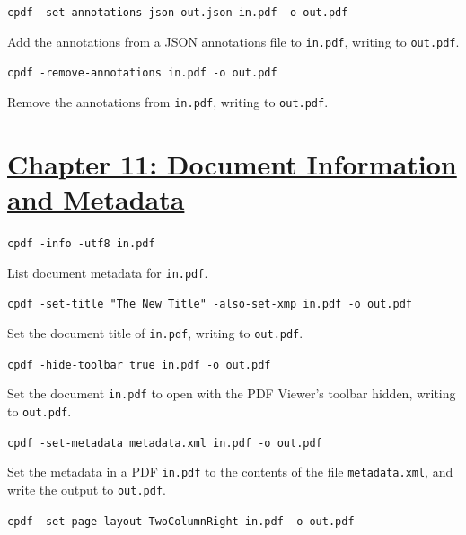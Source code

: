 \documentclass{book}
\begin{document}
\begin{framed}\noindent\texttt{cpdf -set-annotations-json out.json in.pdf -o out.pdf}\end{framed}

\noindent Add the annotations from a JSON annotations file to \texttt{in.pdf}, writing to \texttt{out.pdf}.

\begin{framed}\noindent\texttt{cpdf -remove-annotations in.pdf -o out.pdf}\end{framed}

\noindent Remove the annotations from \texttt{in.pdf}, writing to \texttt{out.pdf}.

\section*{\hyperref[chap:11]{Chapter 11: Document Information and Metadata}}

\begin{framed}\noindent\texttt{cpdf -info -utf8 in.pdf}\end{framed}

\noindent List document metadata for  \texttt{in.pdf}.

\begin{framed}\noindent\texttt{cpdf -set-title "The New Title" -also-set-xmp in.pdf -o out.pdf}\end{framed}

\noindent Set the document title of \texttt{in.pdf}, writing to \texttt{out.pdf}.

\begin{framed}\noindent\texttt{cpdf -hide-toolbar true in.pdf -o out.pdf}\end{framed}

\noindent Set the document \texttt{in.pdf} to open with the PDF Viewer's toolbar hidden, writing to \texttt{out.pdf}.

\begin{framed}\noindent\texttt{cpdf -set-metadata metadata.xml in.pdf -o out.pdf}\end{framed}

\noindent Set the metadata in a PDF \texttt{in.pdf} to the contents of the file \texttt{metadata.xml}, and write the output to \texttt{out.pdf}.

\begin{framed}\noindent\texttt{cpdf -set-page-layout TwoColumnRight in.pdf -o out.pdf}\end{framed}
\end{document}
